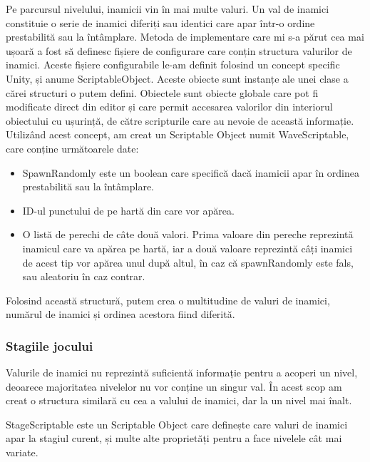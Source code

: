 \documentclass[12pt, a4paper]{article}
\begin{document}
	Pe parcursul nivelului, inamicii vin în mai multe valuri. Un val de inamici constituie o serie de inamici diferiți sau identici care apar într-o ordine prestabilită sau la întâmplare. Metoda de implementare care mi s-a părut cea mai ușoară a fost să definesc fișiere de configurare care conțin structura valurilor de inamici. Aceste fișiere configurabile le-am definit folosind un concept specific Unity, și anume ScriptableObject. Aceste obiecte sunt instanțe ale unei clase a cărei structuri o putem defini. Obiectele sunt obiecte globale care pot fi modificate direct din editor și care permit accesarea valorilor din interiorul obiectului cu ușurință, de către scripturile care au nevoie de această informație. Utilizând acest concept, am creat un Scriptable Object numit WaveScriptable, care conține următoarele date:
	
	\begin{itemize}
		\item SpawnRandomly este un boolean care specifică dacă inamicii apar în ordinea prestabilită sau la întâmplare.
		\item ID-ul punctului de pe hartă din care vor apărea.
		\item O listă de perechi de câte două valori. Prima valoare din pereche reprezintă inamicul care va apărea pe hartă, iar a două valoare reprezintă câți inamici de acest tip vor apărea unul după altul, în caz că spawnRandomly este fals, sau aleatoriu în caz contrar.
	\end{itemize}
	
	Folosind această structură, putem crea o multitudine de valuri de inamici, numărul de inamici și ordinea acestora fiind diferită.
	
	
	
	
	
	\subsubsection{Stagiile jocului}
	\label{section: stageScriptable}
	
	Valurile de inamici nu reprezintă suficientă informație pentru a acoperi un nivel, deoarece majoritatea nivelelor nu vor conține un singur val. În acest scop am creat o structura similară cu cea a valului de inamici, dar la un nivel mai înalt.
	\newline
	
	StageScriptable este un Scriptable Object care definește care valuri de inamici apar la stagiul curent, și multe alte proprietăți pentru a face nivelele cât mai variate.
	
\end{document}
